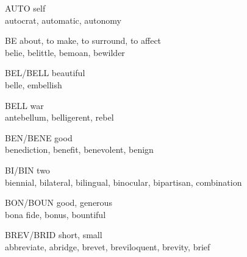\begin{flashcard}[Roots]{AUTO}
self\\
\vspace{0.2in}
autocrat, automatic, autonomy\\
\end{flashcard}

\begin{flashcard}[Roots]{BE}
about, to make, to surround, to affect\\
\vspace{0.2in}
belie, belittle, bemoan, bewilder\\
\end{flashcard}

\begin{flashcard}[Roots]{BEL/BELL}
beautiful\\
\vspace{0.2in}
 belle, embellish\\
\end{flashcard}

\begin{flashcard}[Roots]{BELL}
war\\
\vspace{0.2in}
antebellum, belligerent, rebel\\
\end{flashcard}

\begin{flashcard}[Roots]{BEN/BENE}
good\\
\vspace{0.2in}
benediction, benefit, benevolent, benign\\
\end{flashcard}

\begin{flashcard}[Roots]{BI/BIN}
two\\
\vspace{0.2in}
biennial, bilateral, bilingual, binocular, bipartisan, combination\\
\end{flashcard}

\begin{flashcard}[Roots]{BON/BOUN}
good, generous\\
\vspace{0.2in}
 bona fide, bonus, bountiful\\
\end{flashcard}

\begin{flashcard}[Roots]{BREV/BRID}
 short, small\\
\vspace{0.2in}
abbreviate, abridge, brevet, breviloquent, brevity, brief\\
\end{flashcard}

